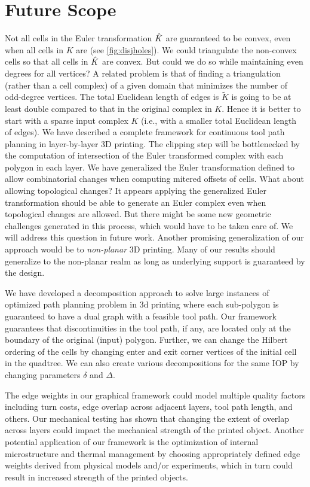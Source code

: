 \chapter{Future Scope}
Not all cells in the Euler transformation $\hat{K}$ are guaranteed to be convex, even when all cells in $K$ are (see \cref{fig:disjholes}).
We could triangulate the non-convex cells so that all cells in $\hat{K}$ are convex.
But could we do so while maintaining even degrees for all vertices?
A related problem is that of finding a triangulation (rather than a cell complex) of a given domain that minimizes the number of odd-degree vertices.
The total Euclidean length of edges is $\tilde{K}$ is going to be at least double compared to that in the original complex in $K$.
Hence it is better to start with a sparse input complex $K$ (i.e., with a smaller total Euclidean length of edges).
We have described a complete framework for continuous tool path planning in layer-by-layer 3D printing.
The clipping step will be bottlenecked by the computation of intersection of the Euler transformed complex with each polygon in each layer.
We have generalized the Euler transformation defined to allow combinatorial changes when computing mitered offsets of cells.
What about allowing topological changes?
It appears applying the generalized Euler transformation should be able to generate an Euler complex even when topological changes are allowed.
But there might be some new geometric challenges generated in this process, which would have to be taken care of.
We will address this question in future work.
Another promising generalization of our approach would be to \emph{non-planar} 3D printing.
Many of our results should generalize to the non-planar realm as long as underlying support is guaranteed by the design.

We have developed a decomposition approach to solve large instances of optimized path planning problem in 3d printing where each sub-polygon is guaranteed to have a dual graph with a feasible tool path. 
Our framework guarantees that discontinuities in the tool path, if any, are located only at the boundary of the original (input) polygon.
Further, we can change the Hilbert ordering of the cells by changing enter and exit corner vertices of the initial cell in the quadtree.
We can also create various decompositions for the same IOP by changing parameters $\delta$ and $\Delta$.

The edge weights in our graphical framework could model multiple quality factors including turn costs, edge overlap across adjacent layers, tool path length, and others.
Our mechanical testing has shown that changing the extent of overlap across layers could impact the mechanical strength of the printed object.
Another potential application of our framework is the optimization of internal microstructure and thermal management by choosing appropriately defined edge weights derived from physical models and/or experiments, which in turn could result in increased strength of the printed objects.

